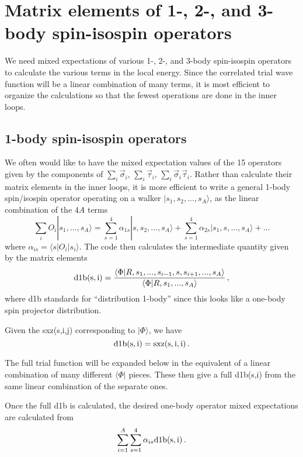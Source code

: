 \documentclass[12pt]{article}
\begin{document}
\section{Matrix elements of 1-, 2-, and 3-body spin-isospin operators}
We need mixed expectations of various 1-, 2-, and 3-body spin-isospin
operators to calculate the various terms in the local energy. Since
the correlated trial wave function will be a linear combination of
many terms, it is most efficient to organize the calculations so that
the fewest operations are done in the inner loops.

\subsection{1-body spin-isospin operators}
We often would like to have the mixed expectation values of
the 15 operators given by the components of $\sum_i \vec \sigma_i$,
$\sum_i \vec \tau_i $,
$\sum_i \vec \sigma_i \vec \tau_i $. Rather than calculate their
matrix elements in the inner loops, it is more efficient to write
a general 1-body spin/isospin operator operating on a walker
$|s_1,s_2,...,s_A\rangle$,
as the linear combination of the $4A$ terms
\begin{equation}
\sum_i O_i |s_1,...,s_A\rangle =
\sum_{s=1}^4 \alpha_{1s}|s,s_2,...,s_A\rangle
+\sum_{s=1}^4 \alpha_{2s}|s_1,s,...,s_A\rangle+...
\end{equation}
where $\alpha_{is} = \langle s|O_i|s_i\rangle$. The code then
calculates the intermediate quantity given by the matrix elements
\begin{equation}
{\rm d1b(s,i)} =
\frac{\langle \Phi|R,s_1,...,s_{i-1},s,s_{i+1},...,s_A\rangle}
{\langle \Phi|R,s_1,...,s_A\rangle}
\,,
\end{equation}
where d1b standards for ``distribution 1-body'' since this looks like
a one-body spin projector distribution.

Given the sxz(s,i,j) corresponding to $|\Phi\rangle$, we have
\begin{equation}
{\rm d1b(s,i)} = {\rm sxz(s,i,i)} \,.
\end{equation}

The full trial function will be expanded below in the equivalent of
a linear combination of many different $\langle \Phi|$ pieces. These
then give a full d1b(s,i) from the same linear combination of
the separate ones.

Once the full d1b is calculated, the desired one-body operator mixed
expectations are calculated from
\begin{equation}
\sum_{i=1}^A\sum_{s=1}^4 \alpha_{is}{\rm d1b(s,i)} \,.
\end{equation}
\end{document}
